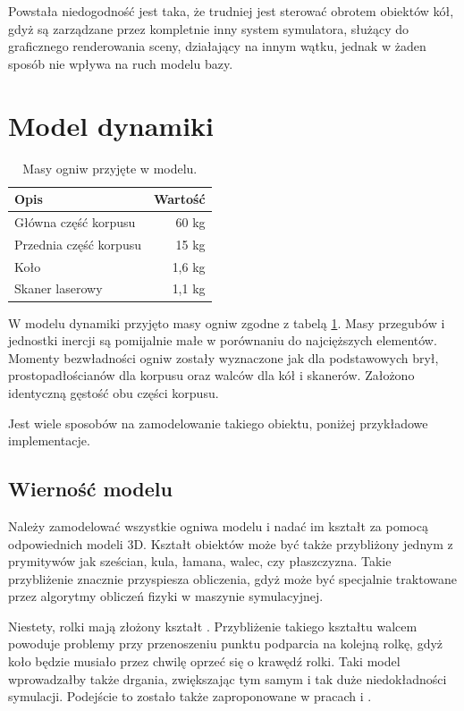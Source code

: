 		Powstała niedogodność jest taka, że trudniej jest sterować obrotem obiektów kół, gdyż są zarządzane przez kompletnie inny system symulatora,
		służący do graficznego renderowania sceny, działający na innym wątku, jednak w żaden sposób nie wpływa na ruch modelu bazy.
		
\section{Model dynamiki}
	\begin{table}
		\centering
		\begin{tabular}{l r}
		Opis & Wartość \\
		\hline
		Główna część korpusu	&	60 \si{\kilo\gram} \\
		Przednia część korpusu	&	15 \si{\kilo\gram} \\
		Koło					&	1,6 \si{\kilo\gram} \\
		Skaner laserowy			&	1,1 \si{\kilo\gram} \\
		\end{tabular}
		\caption{Masy ogniw przyjęte w modelu.}
		\label{tab:masses}
	\end{table}
	
	W modelu dynamiki przyjęto masy ogniw zgodne z tabelą \ref{tab:masses}.
	Masy przegubów i jednostki inercji są pomijalnie małe w porównaniu do najcięższych elementów.
	Momenty bezwładności ogniw zostały wyznaczone jak dla podstawowych brył, prostopadłościanów dla korpusu oraz walców dla kół i skanerów.
	Założono identyczną gęstość obu części korpusu.
	
	Jest wiele sposobów na zamodelowanie takiego obiektu, poniżej przykładowe implementacje.
	
	\subsection{Wierność modelu}
		Należy zamodelować wszystkie ogniwa modelu i nadać im kształt za pomocą odpowiednich modeli 3D.
		Kształt obiektów może być także przybliżony jednym z prymitywów jak sześcian, kula, łamana, walec, czy płaszczyzna.
		Takie przybliżenie znacznie przyspiesza obliczenia, gdyż może być specjalnie traktowane przez algorytmy obliczeń fizyki
		w maszynie symulacyjnej.

		Niestety, rolki mają złożony kształt \cite{rollers}.
		Przybliżenie takiego kształtu walcem powoduje problemy przy przenoszeniu punktu podparcia na kolejną rolkę, gdyż koło będzie musiało przez chwilę oprzeć się o krawędź rolki.
		Taki model wprowadzałby także drgania, zwiększając tym samym i tak duże niedokładności symulacji.
		Podejście to zostało także zaproponowane w pracach \cite{modelling_ways} i \cite{braking}.

